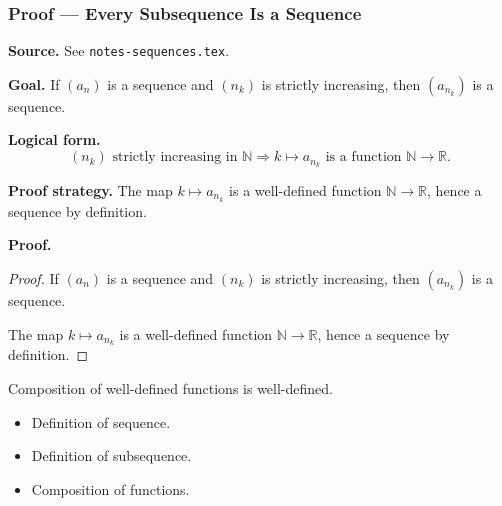 
\clearpage
{}
\hypertarget{proof-RA-ABB-T-subseq-is-seq}{}

\subsubsection[Every Subsequence Is a Sequence]{Proof --- Every Subsequence Is a Sequence}

\bigskip

\noindent
\textbf{Source.}
See \texttt{notes-sequences.tex}.

\vspace{0.75em}

\noindent
\textbf{Goal.}
If $(a_n)$ is a sequence and $(n_k)$ is strictly increasing, then $(a_{n_k})$ is a sequence.

\vspace{0.75em}

\noindent
\textbf{Logical form.}
\[
  (n_k) \text{ strictly increasing in } \mathbb{N} \Rightarrow k \mapsto a_{n_k} \text{ is a function } \mathbb{N} \to \mathbb{R}.
\]

\vspace{0.75em}

\noindent
\textbf{Proof strategy.}
The map $k \mapsto a_{n_k}$ is a well-defined function $\mathbb{N} \to \mathbb{R}$, hence a sequence by definition.

\vspace{0.75em}

\noindent
\textbf{Proof.}
\begin{proof}
\Claim If $(a_n)$ is a sequence and $(n_k)$ is strictly increasing, then $(a_{n_k})$ is a sequence.

\Given 

\Goal 

\Strategy The map $k \mapsto a_{n_k}$ is a well-defined function $\mathbb{N} \to \mathbb{R}$, hence a sequence by definition.

\medskip


\end{proof}

\begin{remark*}
Composition of well-defined functions is well-defined.
\end{remark*}

\begin{remark*}[Dependencies]
\begin{itemize}
  \item Definition of sequence.
  \item Definition of subsequence.
  \item Composition of functions.
\end{itemize}
\end{remark*}
